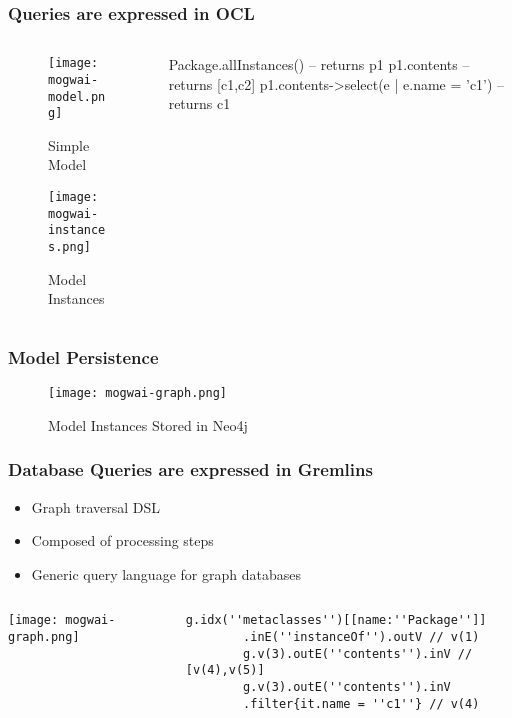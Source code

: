 \begin{frame}[fragile]\frametitle{Queries are expressed in OCL}
	
	\begin{columns}
		\begin{column}{0.5\textwidth}
	    \begin{figure}[htbp]
		    \centering
			  \texttt{[image: mogwai-model.png]}
		    \caption{Simple Model}
	    \end{figure}
	    \begin{figure}[htbp]
		    \centering
			  \texttt{[image: mogwai-instances.png]}
		    \caption{Model Instances}
	    \end{figure}		
		\end{column}
		\begin{column}{0.5\textwidth}
		  \begin{ocl}
        Package.allInstances()  -- returns p1
        p1.contents				-- returns [c1,c2]
        p1.contents->select(e | e.name = 'c1') 
		    -- returns c1
		  \end{ocl}
		\end{column}
	\end{columns}
\end{frame}

\begin{frame}[c]\frametitle{Model Persistence}
	\begin{figure}[htbp]
		\centering
		\texttt{[image: mogwai-graph.png]}
		\caption{Model Instances Stored in Neo4j}
	\end{figure}
\end{frame}

\begin{frame}[fragile]\frametitle{Database Queries are expressed in Gremlins}
	\begin{itemize}
	\item Graph traversal DSL
	\item Composed of processing steps
	\item Generic query language for graph databases
	\end{itemize}
	\begin{columns}
		\begin{column}{0.4\textwidth}
			\texttt{[image: mogwai-graph.png]}
		\end{column}
		\begin{column}{0.6\textwidth}
      \begin{lstlisting}[language=gremlin]
        g.idx(''metaclasses'')[[name:''Package'']]
        .inE(''instanceOf'').outV // v(1)
        g.v(3).outE(''contents'').inV // [v(4),v(5)]
        g.v(3).outE(''contents'').inV
        .filter{it.name = ''c1''} // v(4)
      \end{lstlisting}
		\end{column}
	\end{columns}
	
\end{frame}


